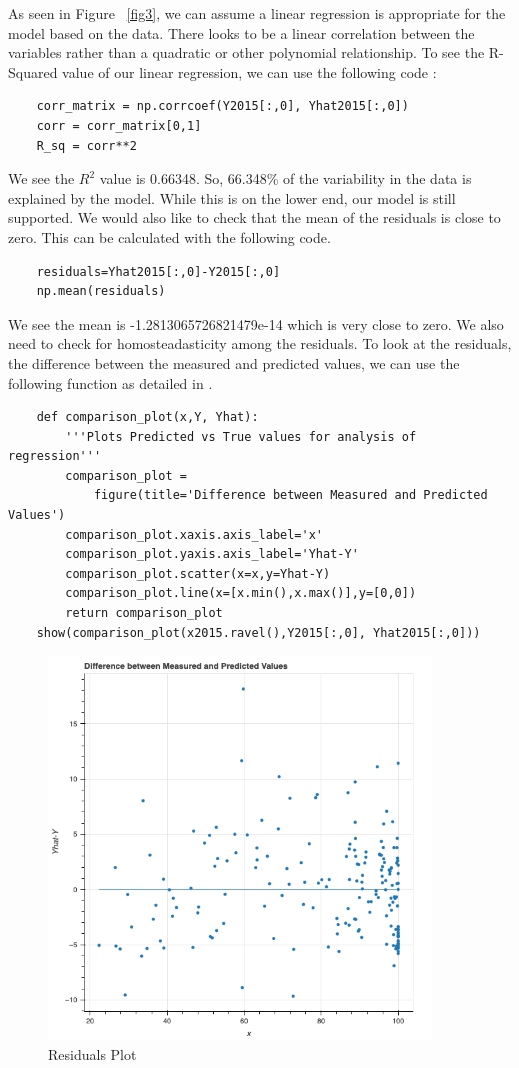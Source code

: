 \documentclass[12pt]{article}
\begin{document}
As seen in Figure ~\ref{fig3}, we can assume a linear regression is appropriate for the model based on the data. There looks to be a linear correlation between the variables rather than a quadratic or other polynomial relationship. To see the R-Squared value of our linear regression, we can use the following code \citep{pythonr2}:
\begin{verbatim}
    corr_matrix = np.corrcoef(Y2015[:,0], Yhat2015[:,0])
    corr = corr_matrix[0,1]
    R_sq = corr**2
\end{verbatim}
We see the $R^2$ value is 0.66348. So, 66.348\% of the variability in the data is explained by the model. While this is on the lower end, our model is still supported. We would also like to check that the mean of the residuals is close to zero. This can be calculated with the following code.
\begin{verbatim}
    residuals=Yhat2015[:,0]-Y2015[:,0]
    np.mean(residuals)
\end{verbatim}
We see the mean is -1.2813065726821479e-14 which is very close to zero. We also need to check for homosteadasticity among the residuals. To look at the residuals, the difference between the measured and predicted values, we can use the following function as detailed in \citet{teitelbaum2021linreg}.
\begin{verbatim}
    def comparison_plot(x,Y, Yhat):
        '''Plots Predicted vs True values for analysis of regression'''
        comparison_plot = 
            figure(title='Difference between Measured and Predicted Values')
        comparison_plot.xaxis.axis_label='x'
        comparison_plot.yaxis.axis_label='Yhat-Y'
        comparison_plot.scatter(x=x,y=Yhat-Y)
        comparison_plot.line(x=[x.min(),x.max()],y=[0,0])
        return comparison_plot
    show(comparison_plot(x2015.ravel(),Y2015[:,0], Yhat2015[:,0]))
\end{verbatim}

\begin{figure}
    \centering
    \includegraphics[width=4in]{Figures/figure3.png}
    \caption{Residuals Plot}
    \label{fig5}
\end{figure}
\end{document}
